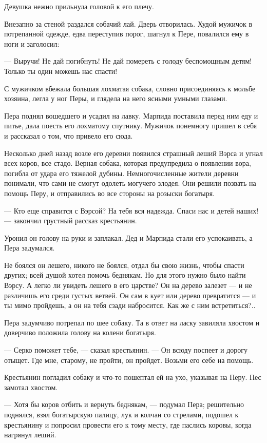 \documentclass[12pt, a4paper, openany]{book}
\begin{document}
	Девушка нежно прильнула головой к его плечу.
	
	Внезапно за стеной раздался собачий лай. Дверь отворилась. Худой мужичок в потрепанной одежде, едва переступив порог, шагнул к Пере, повалился ему в ноги и заголосил:
	
	— Выручи! Не дай погибнуть! Не дай помереть с голоду беспомощным детям! Только ты один можешь нас спасти!
	
	С мужичком вбежала большая лохматая собака, словно присоединяясь к мольбе хозяина, легла у ног Перы, и глядела на него ясными умными глазами.
	
	Пера поднял вошедшего и усадил на лавку. Марпида поставила перед ним еду и питье, дала поесть его лохматому спутнику. Мужичок понемногу пришел в себя и рассказал о том, что привело его сюда.
	
	Несколько дней назад возле его деревни появился страшный леший Вэрса и угнал всех коров, все стадо. Верная собака, которая предупредила о появлении вора, погибла от удара его тяжелой дубины. Немногочисленные жители деревни понимали, что сами не смогут одолеть могучего злодея. Они решили позвать на помощь Перу, и отправились во все стороны на розыски богатыря.
	
	— Кто еще справится с Вэрсой? На тебя вся надежда. Спаси нас и детей наших! — закончил грустный рассказ крестьянин.
	
	Уронил он голову на руки и заплакал. Дед и Марпида стали его успокаивать, а Пера задумался.
	
	Не боялся он лешего, никого не боялся, отдал бы свою жизнь, чтобы спасти других; всей душой хотел помочь беднякам. Но для этого нужно было найти Вэрсу. А легко ли увидеть лешего в его царстве? Он на дерево залезет — и не различишь его среди густых ветвей. Он сам в кует или дерево превратится — и ты мимо пройдешь, а он на тебя сзади набросится. Как же с ним встретиться?..
	
	Пера задумчиво потрепал по шее собаку. Та в ответ на ласку завиляла хвостом и доверчиво положила голову на колени богатыря.
	
	— Серко поможет тебе, — сказал крестьянин. — Он всюду поспеет и дорогу отыщет. Где мне, старому, не пройти, он пройдет. Возьми его себе на помощь.
	
	Крестьянин погладил собаку и что-то пошептал ей на ухо, указывая на Перу. Пес замотал хвостом.
	
	— Хотя бы коров отбить и вернуть беднякам, — подумал Пера; решительно поднялся, взял богатырскую палицу, лук и колчан со стрелами, подошел к крестьянину и попросил провести его к тому месту, где паслись коровы, когда нагрянул леший.
	
\end{document}
